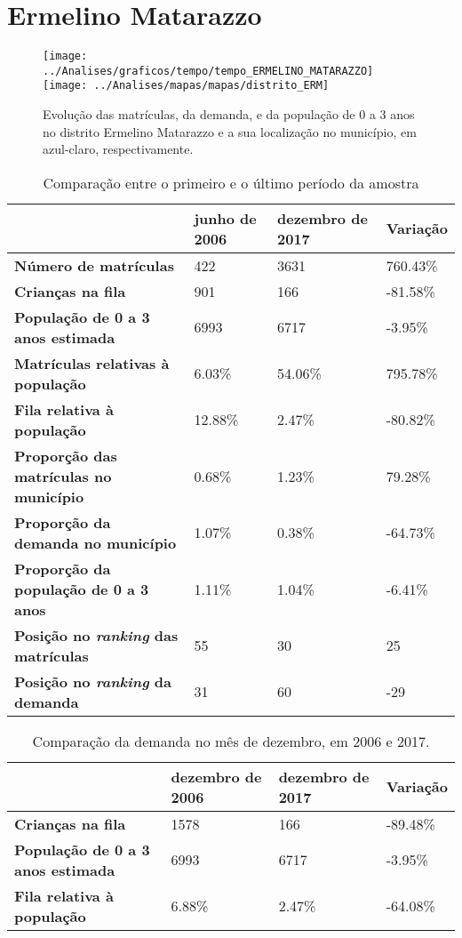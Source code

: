 \section{Ermelino Matarazzo}
\begin{figure}[H]
\centering
\texttt{[image: ../Analises/graficos/tempo/tempo\_ERMELINO\_MATARAZZO]}
\texttt{[image: ../Analises/mapas/mapas/distrito\_ERM]}
\caption{Evolução das matrículas, da demanda, e da população de 0 a 3 anos no distrito Ermelino Matarazzo e a sua localização no município, em azul-claro, respectivamente.}
\end{figure}
\begin{table}[H]
\begin{tabular}{l|l|l|l}
\textbf{}                                      & \textbf{junho de 2006}       & \textbf{dezembro de 2017}    & \textbf{Variação} \\ \hline
\textbf{Número de matrículas}                  & 422 & 3631 & 760.43\% \\ \hline
\textbf{Crianças na fila}                      & 901 & 166 & -81.58\% \\ \hline
\textbf{População de 0 a 3 anos estimada}      & 6993 & 6717 & -3.95\% \\ \hline
\textbf{Matrículas relativas à população}      & 6.03\% & 54.06\% & 795.78\% \\ \hline
\textbf{Fila relativa à população}             & 12.88\% & 2.47\% & -80.82\% \\ \hline
\textbf{Proporção das matrículas no município} & 0.68\% & 1.23\% & 79.28\% \\ \hline
\textbf{Proporção da demanda no município}     & 1.07\% & 0.38\% & -64.73\% \\ \hline
\textbf{Proporção da população de 0 a 3 anos}  & 1.11\% & 1.04\% & -6.41\% \\ \hline
\textbf{Posição no \textit{ranking} das matrículas}     & 55 & 30 & 25 \\ \hline
\textbf{Posição no \textit{ranking} da demanda}         & 31 & 60 & -29 \\ 
\end{tabular}
\caption{Comparação entre o primeiro e o último período da amostra}
\end{table}
\begin{table}[H]
\begin{tabular}{l|l|l|l}
\textbf{}                                 & \textbf{dezembro de 2006} & \textbf{dezembro de 2017} & \textbf{Variação} \\ \hline
\textbf{Crianças na fila}                      & 1578 & 166 & -89.48\% \\ \hline
\textbf{População de 0 a 3 anos estimada}      & 6993 & 6717 & -3.95\% \\ \hline
\textbf{Fila relativa à população}             & 6.88\% & 2.47\% & -64.08\% \\
\end{tabular}
\caption{Comparação da demanda no mês de dezembro, em 2006 e 2017.}
\end{table}
